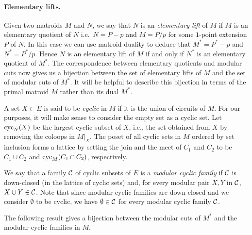 \documentclass{daj}
\begin{document}
\paragraph{Elementary lifts.}
 Given two matroids $M$ and $N$, we say that $N$ is  an {\em elementary lift} of $M$ if $M$ is an elementary quotient of $N$ i.e.~$N=P-p$ and $M=P/p$ for some $1$-point extension $P$ of $N$. In this case we can use matroid duality to deduce that $M^*=P^*-p$ and $N^*=P^*/p$. Hence $N$ is an elementary lift of $M$ if and only if $N^*$ is an elementary quotient of $M^*$.
The correspondence between elementary quotients and modular cuts now gives us a bijection between the set of elementary lifts of $M$ and the set of modular cuts of $M^*$. It will be helpful to describe this bijection in terms of the primal matroid $M$ rather than its dual $M^*$.


A set $X\subset E$ is said to be {\em cyclic} in $M$ if it is the union of circuits of $M$.
For our purposes, it will make sense to consider the empty set as a cyclic set.
Let ${\rm cyc}_N(X)$ be the largest cyclic subset of $X$, i.e., the set obtained from $X$ by removing the coloops in $M|_X$. The poset of all cyclic sets in $M$ ordered by set inclusion forms a lattice by setting the join and the meet of $C_1$ and $C_2$ to be  $C_1\cup C_2$ and ${\rm cyc}_M(C_1\cap C_2)$, respectively.

We say that a family ${\cal C}$ of cyclic subsets of $E$ is  a {\em modular cyclic family} if
${\cal C}$ is down-closed (in the lattice of cyclic sets) and,
for every modular pair $X, Y$ in $\cal C$, $X\cup Y\in {\cal C}$. Note that since modular cyclic families are down-closed and we consider $\emptyset$ to be cyclic, we have $\emptyset\in {\cal C}$ for every modular cyclic family $\cal C$. 

The following result gives a bijection between the modular cuts
of $M^*$
and the modular cyclic families in $M$.
\end{document}
